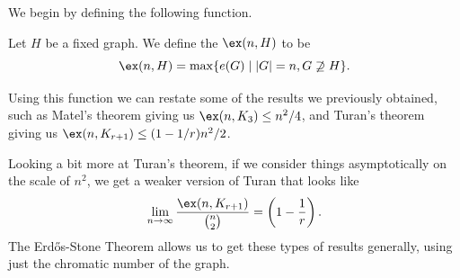 We begin by defining the following function.

\begin{definition}
	Let $H$ be a fixed graph. We define the  $\ex(n, H)$ to be
	$$\ex(n, H) = \max\{e(G) \mid |G| = n, G \not\supseteq H\}.$$
\end{definition}

Using this function we can restate some of the results we previously obtained, such as Matel's theorem giving us $\ex(n, K_3) \leq n^2/4$, and Turan's theorem giving us $\ex(n, K_{r + 1}) \leq (1 - 1/r)n^2/2$. 

Looking a bit more at Turan's theorem, if we consider things asymptotically on the scale of $n^2$, we get a weaker version of Turan that looks like
$$
\lim_{n \to \infty} \frac{\ex(n, K_{r + 1})}{\binom{n}{2}} = \left(1 - \frac 1r\right).
$$
The Erdős-Stone Theorem allows us to get these types of results generally, using just the chromatic number of the graph.


